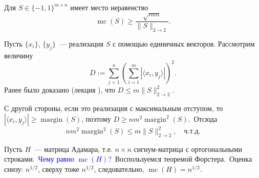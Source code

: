 \documentclass[handout]{beamer}
\renewcommand\le{\leqslant}
\renewcommand\ge{\geqslant}
\DeclareMathOperator{\margin}{margin}
\DeclareMathOperator{\mc}{mc}
\begin{document}
\begin{frame}

    \begin{theorem}[Forster, 2002]
        Для $S\in\{-1,1\}^{m\times n}$ имеет место неравенство
        $$
        \mc(S) \ge \frac{\sqrt{mn}}{\|S\|_{2\to2}}.
        $$
    \end{theorem}
    \pause\vspace{5pt}

    Пусть $\{x_i\}$, $\{y_j\}$~--- реализация $S$ с помощью единичных векторов. Рассмотрим величину
    $$
    D := \sum_{j=1}^n (\sum_{i=1}^m |\langle x_i,y_j\rangle|)^2.
    $$
    \pause
    Ранее было доказано (лекция ), что $D\le m\|S\|_{2\to2}^2$.
    \pause

    С другой стороны, если это реализация с максимальным отступом, то $|\langle
    x_i,y_j\rangle|\ge \margin(S)$, поэтому $D \ge
    nm^2\margin^2(S)$.\pause~Отсюда
    $$
    nm^2\margin^2(S) \le m\|S\|_{2\to2}^2,\quad\mbox{ч.т.д.}
    $$

\end{frame}
\begin{frame}
    Пусть $H$~--- матрица Адамара, т.е. $n\times n$ сигнум-матрица с
    ортогональными строками.\pause~\textcolor{blue}{Чему равно
    $\mc(H)$?}\pause~Воспользуемся теоремой Форстера.\pause~Оценка снизу:
    $n^{1/2}$, сверху тоже $n^{1/2}$, следовательно, $\mc(H)=n^{1/2}$.


\end{frame}
\end{document}
